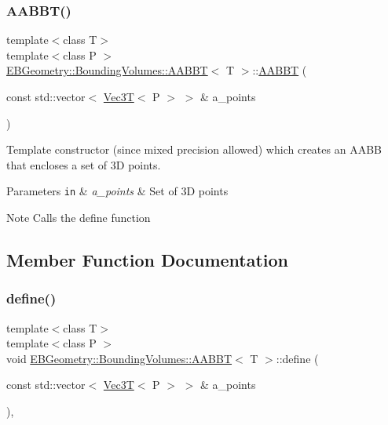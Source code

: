 \subsubsection{\texorpdfstring{A\+A\+B\+B\+T()}{AABBT()}\hspace{0.1cm}{\footnotesize\ttfamily [4/4]}}
{\footnotesize\ttfamily template$<$class T$>$ \\
template$<$class P $>$ \\
\hyperlink{classEBGeometry_1_1BoundingVolumes_1_1AABBT}{E\+B\+Geometry\+::\+Bounding\+Volumes\+::\+A\+A\+B\+BT}$<$ T $>$\+::\hyperlink{classEBGeometry_1_1BoundingVolumes_1_1AABBT}{A\+A\+B\+BT} (\begin{DoxyParamCaption}\item[{const std\+::vector$<$ \hyperlink{classVec3T}{Vec3T}$<$ P $>$ $>$ \&}]{a\+\_\+points }\end{DoxyParamCaption})}



Template constructor (since mixed precision allowed) which creates an A\+A\+BB that encloses a set of 3D points. 


\begin{DoxyParams}[1]{Parameters}
\mbox{\tt in}  & {\em a\+\_\+points} & Set of 3D points \\
\hline
\end{DoxyParams}
\begin{DoxyNote}{Note}
Calls the define function 
\end{DoxyNote}


\subsection{Member Function Documentation}
\mbox{\label{classEBGeometry_1_1BoundingVolumes_1_1AABBT_a71467f66f1d9c1622c750273ca79946a}} 
\subsubsection{\texorpdfstring{define()}{define()}}
{\footnotesize\ttfamily template$<$class T$>$ \\
template$<$class P $>$ \\
void \hyperlink{classEBGeometry_1_1BoundingVolumes_1_1AABBT}{E\+B\+Geometry\+::\+Bounding\+Volumes\+::\+A\+A\+B\+BT}$<$ T $>$\+::define (\begin{DoxyParamCaption}\item[{const std\+::vector$<$ \hyperlink{classVec3T}{Vec3T}$<$ P $>$ $>$ \&}]{a\+\_\+points }\end{DoxyParamCaption})\hspace{0.3cm}{\ttfamily [inline]}, {\ttfamily [noexcept]}}



